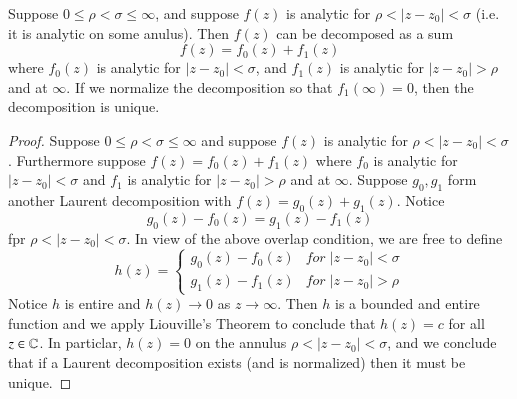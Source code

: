 \begin{theorem}
    Suppose $0 \leq \rho < \sigma \leq \infty$, and suppose $f(z)$ is analytic for $\rho < |z-z_0| < \sigma$ (i.e. it is analytic on some anulus). Then $f(z)$ can be decomposed as a sum \begin{equation*}
        f(z) = f_0(z) + f_1(z)
    \end{equation*}
    where $f_0(z)$ is analytic for $|z-z_0| < \sigma$, and $f_1(z)$ is analytic for $|z-z_0| > \rho$ and at $\infty$. If we normalize the decomposition so that $f_1(\infty) = 0$, then the decomposition is unique.
\end{theorem}
\begin{proof}
    Suppose $0 \leq \rho < \sigma \leq \infty$ and suppose $f(z)$ is analytic for $\rho < |z-z_0| < \sigma$. Furthermore suppose $f(z) = f_0(z)+f_1(z)$ where $f_0$ is analytic for $|z-z_0| < \sigma$ and $f_1$ is analytic for $|z-z_0| > \rho$ and at $\infty$. Suppose $g_0,g_1$ form another Laurent decomposition with $f(z) = g_0(z) + g_1(z)$. Notice \begin{equation*}
        g_0(z) - f_0(z) = g_1(z) - f_1(z)
    \end{equation*}
    fpr $\rho < |z-z_0| < \sigma$. In view of the above overlap condition, we are free to define \begin{equation*}
        h(z) = \left\{\begin{array}{lc} g_0(z) - f_0(z) & for\;|z-z_0| < \sigma \\ g_1(z) - f_1(z) & for\;|z-z_0| > \rho \end{array}\right.
    \end{equation*}
    Notice $h$ is entire and $h(z)\rightarrow 0$ as $z\rightarrow \infty$. Then $h$ is a bounded and entire function and we apply Liouville's Theorem to conclude that $h(z) = c$ for all $z \in \mathbb C$. In particlar, $h(z) = 0$ on the annulus $\rho < |z-z_0| < \sigma$, and we conclude that if a Laurent decomposition exists (and is normalized) then it must be unique.


\end{proof}
